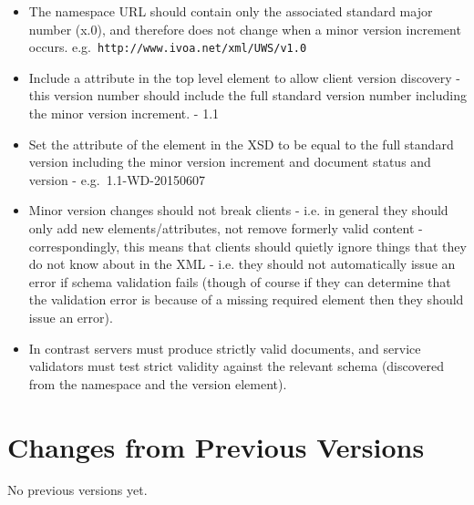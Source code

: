 \documentclass[10pt,a4paper]{ivoa}
\begin{document}
\begin{itemize}
\item The namespace URL should contain only the associated standard major number
(x.0), and therefore does not change when a minor version increment occurs.
e.g.\ \texttt{http://www.ivoa.net/xml/UWS/v1.0}

\item Include a  attribute in the top level element to allow
client version discovery - this version number should include the full standard version
number including the minor version increment. - 1.1

\item Set the  attribute of the  element in the
XSD to be equal to the full standard version including the minor version
increment and document status and version - e.g.\ 1.1-WD-20150607

\item Minor version changes should not break clients - i.e. in general they
should only add new elements/attributes, not remove formerly valid content -
correspondingly, this means that clients should quietly ignore things that they
do not know about in the XML - i.e. they should not automatically issue an error
if schema validation fails (though of course if they can determine that the
validation error is because of a missing required element then they should
issue an error).
\item In contrast servers must produce strictly valid documents, and service
validators must test strict validity against the relevant schema (discovered
from the namespace and the version element).
\end{itemize}




\appendix


\section{Changes from Previous Versions}

No previous versions yet.  



\end{document}

